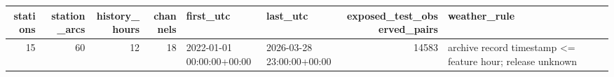 \begin{tabular}{rrrrllrl}
\hline
stations & station\_arcs & history\_hours & channels & first\_utc & last\_utc & exposed\_test\_observed\_pairs & weather\_rule \\
\hline
15 & 60 & 12 & 18 & 2022-01-01 00:00:00+00:00 & 2026-03-28 23:00:00+00:00 & 14583 & archive record timestamp <= feature hour; release unknown \\
\hline
\end{tabular}
